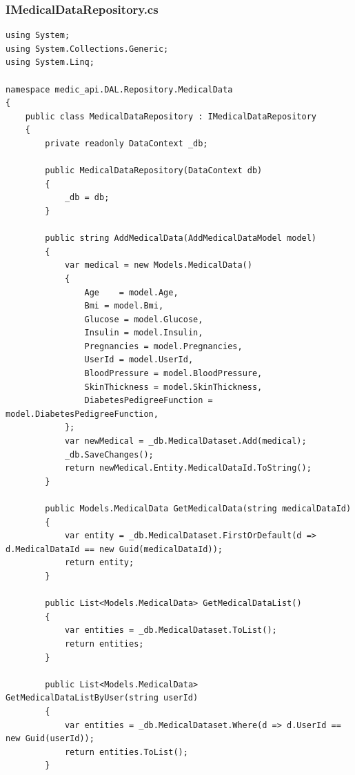 \documentclass[12pt,a4paper]{article}
\begin{document}
	\subsubsection{IMedicalDataRepository.cs}
	\begin{lstlisting}
using System;
using System.Collections.Generic;
using System.Linq;

namespace medic_api.DAL.Repository.MedicalData
{
    public class MedicalDataRepository : IMedicalDataRepository
    {
        private readonly DataContext _db;

        public MedicalDataRepository(DataContext db)
        {
            _db = db;
        }

        public string AddMedicalData(AddMedicalDataModel model)
        {
            var medical = new Models.MedicalData()
            {
                Age    = model.Age,
                Bmi = model.Bmi,
                Glucose = model.Glucose,
                Insulin = model.Insulin,
                Pregnancies = model.Pregnancies,
                UserId = model.UserId,
                BloodPressure = model.BloodPressure,
                SkinThickness = model.SkinThickness,
                DiabetesPedigreeFunction = model.DiabetesPedigreeFunction,
            };
            var newMedical = _db.MedicalDataset.Add(medical);
            _db.SaveChanges();
            return newMedical.Entity.MedicalDataId.ToString();
        }

        public Models.MedicalData GetMedicalData(string medicalDataId)
        {
            var entity = _db.MedicalDataset.FirstOrDefault(d => d.MedicalDataId == new Guid(medicalDataId));
            return entity;
        }

        public List<Models.MedicalData> GetMedicalDataList()
        {
            var entities = _db.MedicalDataset.ToList();
            return entities;
        }

        public List<Models.MedicalData> GetMedicalDataListByUser(string userId)
        {
            var entities = _db.MedicalDataset.Where(d => d.UserId == new Guid(userId));
            return entities.ToList();
        }
        

\end{lstlisting}
\end{document}
